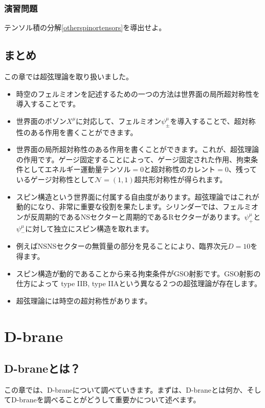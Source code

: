 \documentclass[report,paper=a4, fontsize=12pt, line_length=16cm, number_of_lines=34,dvipdfmx]{jlreq}
\numberwithin{equation}{chapter}
\numberwithin{equation}{section}
\newcommand{\Ncal}{\mathcal{N}}
\begin{document}
\subsection*{演習問題}
テンソル積の分解\eqref{otherspinortensors}を導出せよ。

\section{まとめ}

この章では超弦理論を取り扱いました。
\begin{itemize}
  \item 時空のフェルミオンを記述するための一つの方法は世界面の局所超対称性を導入することです。
  \item 世界面のボゾン$X^{\mu}$に対応して、フェルミオン$\psi_{\pm}^{\mu}$を導入することで、超対称性のある作用を書くことができます。
  \item 世界面の局所超対称性のある作用を書くことができます。これが、超弦理論の作用です。ゲージ固定することによって、ゲージ固定された作用、拘束条件としてエネルギー運動量テンソル$=0$と超対称性のカレント$=0$、残っているゲージ対称性として$\Ncal=(1,1)$超共形対称性が得られます。
  \item スピン構造という世界面に付属する自由度があります。超弦理論ではこれが動的になり、非常に重要な役割を果たします。シリンダーでは、フェルミオンが反周期的であるNSセクターと周期的であるRセクターがあります。$\psi^{\mu}_{+}$と$\psi^{\mu}_{-}$に対して独立にスピン構造を取れます。
  \item 例えばNSNSセクターの無質量の部分を見ることにより、臨界次元$D=10$を得ます。
  \item スピン構造が動的であることから来る拘束条件がGSO射影です。GSO射影の仕方によって type IIB, type IIAという異なる２つの超弦理論が存在します。
  \item 超弦理論には時空の超対称性があります。
\end{itemize}


\chapter{D-brane}

\section{D-braneとは？}

この章では、D-braneについて調べていきます。まずは、D-braneとは何か、そしてD-braneを調べることがどうして重要かについて述べます。
\end{document}
